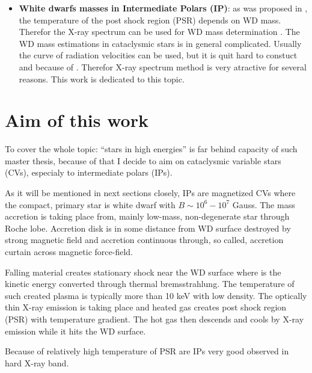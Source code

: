 \documentclass[oneside,a4paper,11pt]{report}
\begin{document}
\begin{itemize}
 \item \textbf{White dwarfs masses in Intermediate Polars (IP)}: as was proposed in \citet{1981ApJ...250..723R}, 
the temperature of the post shock region (PSR) depends on WD mass. Therefor the X-ray spectrum can be 
used for WD mass determination \citet{2005A&A...435..191S}. The WD mass estimations in cataclysmic stars 
is in general complicated. Usually the curve of radiation velocities can be used, but it is quit hard to constuct and
because of . 
Therefor X-ray spectrum method is very atractive for several reasons. This work is dedicated to this topic.  

\end{itemize}

\section{Aim of this work}
To cover the whole topic: ``stars in high energies'' is far behind capacity of such master thesis, because of that I decide 
to aim on cataclysmic variable stars (CVs), especialy to intermediate polars (IPs). 

As it will be mentioned in next sections closely, IPs are magnetized CVs where the compact, primary star 
is white dwarf with $B\sim 10^6 -10^7$ Gauss. The mass accretion is taking place from, mainly low-mass, non-degenerate star through Roche lobe.  
Accretion disk is in some distance from WD surface destroyed by strong magnetic field and 
accretion continuous through, so called, accretion curtain across magnetic force-field.

Falling material creates stationary shock near the WD surface where is the kinetic energy converted 
through thermal bremsstrahlung. The temperature of such created plasma is typically more than 
10 keV with low density. The optically thin X-ray emission is taking place and heated gas creates 
post shock region (PSR) with temperature gradient. The hot gas then descends and cools by X-ray 
emission while it hits the WD surface.      

Because of relatively high temperature of PSR are IPs very good observed in hard X-ray band. 
\end{document}
